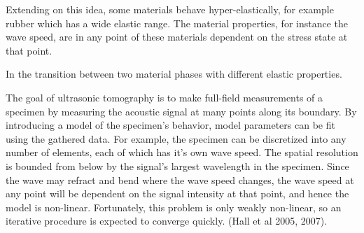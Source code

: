 Extending on this idea, some materials behave hyper-elastically, for example rubber which has a wide elastic range. The material properties, for instance the wave speed, are in any point of these materials dependent on the stress state at that point. 

In the transition between two material phases with different elastic properties.


The goal of ultrasonic tomography is to make full-field measurements of a specimen by measuring the acoustic signal at many points along its boundary. By introducing a model of the specimen's behavior, model parameters can be fit using the gathered data. For example, the specimen can be discretized into any number of elements, each of which has it's own wave speed. The spatial resolution is bounded from below by the signal's largest wavelength in the specimen. Since the wave may refract and bend where the wave speed changes, the wave speed at any point will be dependent on the signal intensity at that point, and hence the model is non-linear. Fortunately, this problem is only weakly non-linear, so an iterative procedure is expected to converge quickly. (Hall et al 2005, 2007).

